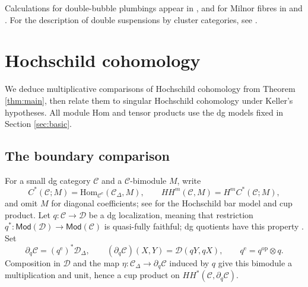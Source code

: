 \documentclass[11pt,letterpaper,reqno]{amsart}
\theoremstyle{plain}
\theoremstyle{definition}
\theoremstyle{plain}
\theoremstyle{definition}
\numberwithin{equation}{section}
\begin{document}
Calculations for double-bubble plumbings appear in \cite[Proposition 5.2 and Corollaries 5.7--5.8]{Smith-Wemyss2023}, and for Milnor fibres in \cite[Section 3]{Lekili-Ueda2021} and \cite[Theorem 6.11]{Lekili-Ueda2022}.
For the description of double suspensions by cluster categories, see \cite[Theorems 2.2 and 4.1]{Lekili-Ueda2024}.



\section{Hochschild cohomology}\label{sec:hochschild}

We deduce multiplicative comparisons of Hochschild cohomology from Theorem \ref{thm:main}, then relate them to singular Hochschild cohomology under Keller's hypotheses.
All module Hom and tensor products use the dg models fixed in Section \ref{sec:basic}.

\subsection{The boundary comparison}

For a small dg category $\mathscr C$ and a $\mathscr C$-bimodule $M$, write
\[
C^*(\mathscr C;M)
=\mathrm{Hom}_{\mathscr C^{\mathrm e}}(\mathscr C_\Delta,M),
\qquad
HH^m(\mathscr C,M)=H^mC^*(\mathscr C;M),
\]
and omit $M$ for diagonal coefficients; see \cite[Section 5.4]{Keller2006b} for the Hochschild bar model and cup product.
Let $q:\mathscr C\to\mathscr D$ be a dg localization, meaning that restriction $q^*:\mathsf{Mod}(\mathscr D)\to\mathsf{Mod}(\mathscr C)$ is quasi-fully faithful; dg quotients have this property \cite[Section 3.9]{Keller2011}.
Set
\begin{equation}\label{eq:boundary-coefficient}
\partial_q\mathscr C=(q^{\mathrm e})^*\mathscr D_\Delta,
\qquad
(\partial_q\mathscr C)(X,Y)=\mathscr D(qY,qX),
\qquad
q^{\mathrm e}=q^{\mathrm{op}}\otimes q.
\end{equation}
Composition in $\mathscr D$ and the map $\eta:\mathscr C_\Delta\to\partial_q\mathscr C$ induced by $q$ give this bimodule a multiplication and unit, hence a cup product on $HH^*(\mathscr C,\partial_q\mathscr C)$.
\end{document}

